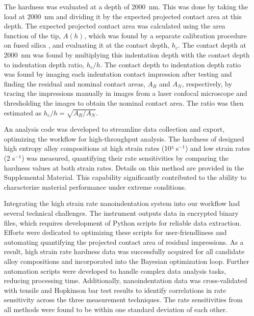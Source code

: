 The hardness was evaluated at a depth of 2000~nm. This was done by taking the load at 2000~nm and dividing it by the expected projected contact area at this depth. The expected projected contact area was calculated using the area function of the tip, \(A(h)\), which was found by a separate calibration procedure on fused silica \cite{Oliver1992}, and evaluating it at the contact depth, \(h_c\). The contact depth at 2000~nm was found by multiplying this indentation depth with the contact depth to indentation depth ratio, \(h_c/h\). The contact depth to indentation depth ratio was found by imaging each indentation contact impression after testing and finding the residual and nominal contact areas, \(A_R\) and \(A_N\), respectively, by tracing the impressions manually in images from a laser confocal microscope and thresholding the images to obtain the nominal contact area. The ratio was then estimated as \(h_c/h = \sqrt{A_R/A_N}\).


An analysis code was developed to streamline data collection and export, optimizing the workflow for high-throughput analysis. The hardness of designed high entropy alloy compositions at high strain rates (10³ s\(^{-1}\)) and low strain rates (2 s\(^{-1}\)) was measured, quantifying their rate sensitivities by comparing the hardness values at both strain rates. Details on this method are provided in the Supplemental Material. This capability significantly contributed to the ability to characterize material performance under extreme conditions.




Integrating the high strain rate nanoindentation system into our workflow had several technical challenges. The instrument outputs data in encrypted binary files, which requires development of Python scripts for reliable data extraction. Efforts were dedicated to optimizing these scripts for user-friendliness and automating quantifying the projected contact area of residual impressions. %
As a result, high strain rate hardness data was successfully acquired for all candidate alloy compositions and incorporated into the Bayesian optimization loop. Further automation scripts were developed to handle complex data analysis tasks, reducing processing time. Additionally, nanoindentation data was cross-validated with tensile and Hopkinson bar test results to identify correlations in rate sensitivity across the three measurement techniques. The rate sensitivities from all methods were found to be within one standard deviation of each other.


